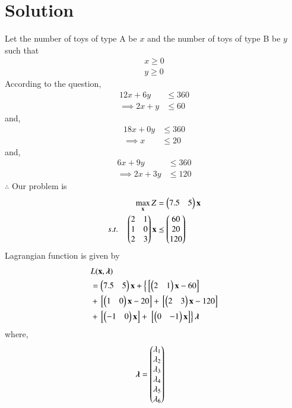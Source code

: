 \documentclass[journal,12pt,twocolumn]{IEEEtran}
\begin{document}
\section{Solution}
Let the number of toys of type A be $x$ and the number of toys of type B be $y$  such that 
\begin{align}
    x \geq 0 \\
    y \geq 0 
\end{align}
According to the question,
\begin{align}
    12x+6y &\leq 360 \\
    \implies 2x+y &\leq 60 
\end{align}
and,
\begin{align}
    18x+0y &\leq 360 \\
    \implies x &\leq 20
\end{align}
and,
\begin{align}
     6x+9y &\leq 360 \\
    \implies 2x+3y &\leq 120 
\end{align}
$\therefore$ Our problem is
\begin{align}
        \max_{\mathbf{x}} Z &= \begin{pmatrix}7.5 & 5\end{pmatrix}\mathbf{x}\\
        s.t. \quad 
        \begin{pmatrix}2 & 1 \\ 1 & 0 \\2 & 3 \end{pmatrix}\mathbf{x} &\preceq \begin{pmatrix}60\\20\\120\end{pmatrix} 
\end{align}
Lagrangian function is given by
\begin{equation}
\begin{aligned}
    &L(\mathbf{x},\boldsymbol{\lambda}) \\ &= \begin{pmatrix}7.5 & 5\end{pmatrix}\mathbf{x}+\left\{{}\left[\begin{pmatrix}2 & 1\end{pmatrix}\mathbf{x}-60\right]\right. \\ &+ {}\left[\begin{pmatrix}1 & 0\end{pmatrix}\mathbf{x}-20\right] +{}\left[\begin{pmatrix}2 & 3\end{pmatrix}\mathbf{x}-120\right] \\ &+ {}\left[\begin{pmatrix}-1 & 0\end{pmatrix}\mathbf{x}\right] +\left.{}\left[\begin{pmatrix}0 & -1\end{pmatrix}\mathbf{x}\right]\right\}\boldsymbol{\lambda}
\end{aligned}
\end{equation}
where,
\begin{align}
    \boldsymbol{\lambda} &= \begin{pmatrix}\lambda_1 \\ \lambda_2 \\ \lambda_3 \\ \lambda_4 \\ \lambda_5 \\ \lambda_6\end{pmatrix}
\end{align}
\end{document}
